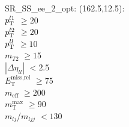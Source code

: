 SR\_SS\_ee\_2\_opt: (162.5,12.5): \\
$p_{\text{T}}^{l1}$ $\geq 20$ \\
$p_{\text{T}}^{l2}$ $\geq 20$ \\
$p_{\text{T}}^{ll}$ $\geq 10$ \\
$m_{T2}$ $\geq 15$ \\
$|\Delta\eta_{ll}|$ $<2.5$ \\
$E_{\text{T}}^{\text{miss,rel}}$ $\geq 75$ \\
$m_{\text{eff}}$ $\geq 200$ \\
$m_{\text{T}}^{\text{max}}$ $\geq 90$ \\
$m_{lj}$/$m_{ljj}$ $<130$ \\
